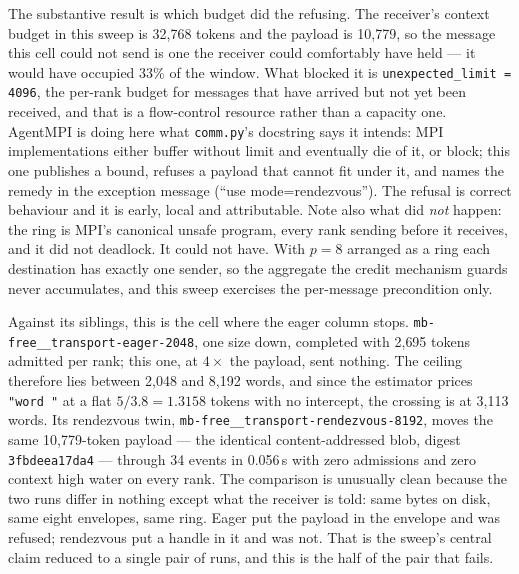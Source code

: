 \documentclass[11pt]{article}
\begin{document}
The substantive result is which budget did the refusing. The receiver's context
budget in this sweep is 32{,}768 tokens and the payload is 10{,}779, so the message
this cell could not send is one the receiver could comfortably have held --- it would
have occupied 33\% of the window. What blocked it is
\texttt{unexpected\_limit = 4096}, the per-rank budget for messages that have arrived
but not yet been received, and that is a flow-control resource rather than a capacity
one. AgentMPI is doing here what \texttt{comm.py}'s docstring says it intends: MPI
implementations either buffer without limit and eventually die of it, or block; this
one publishes a bound, refuses a payload that cannot fit under it, and names the
remedy in the exception message (``use mode=rendezvous''). The refusal is correct
behaviour and it is early, local and attributable. Note also what did \emph{not}
happen: the ring is MPI's canonical unsafe program, every rank sending before it
receives, and it did not deadlock. It could not have. With $p = 8$ arranged as a
ring each destination has exactly one sender, so the aggregate the credit mechanism
guards never accumulates, and this sweep exercises the per-message precondition only.

Against its siblings, this is the cell where the eager column stops.
\texttt{mb-free\_\_transport-eager-2048}, one size down, completed with 2{,}695
tokens admitted per rank; this one, at $4\times$ the payload, sent nothing. The
ceiling therefore lies between 2{,}048 and 8{,}192 words, and since the estimator
prices \texttt{"word "} at a flat $5/3.8 = 1.3158$ tokens with no intercept, the
crossing is at 3{,}113 words. Its rendezvous twin,
\texttt{mb-free\_\_transport-rendezvous-8192}, moves the same 10{,}779-token payload
--- the identical content-addressed blob, digest \texttt{3fbdeea17da4} --- through 34
events in 0.056\,s with zero admissions and zero context high water on every rank.
The comparison is unusually clean because the two runs differ in nothing except what
the receiver is told: same bytes on disk, same eight envelopes, same ring. Eager put
the payload in the envelope and was refused; rendezvous put a handle in it and was
not. That is the sweep's central claim reduced to a single pair of runs, and this is
the half of the pair that fails.
\end{document}
